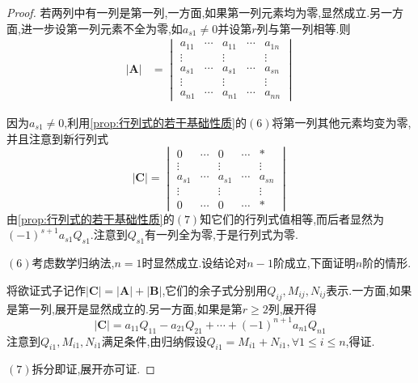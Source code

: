 {\begin{proof}
        若两列中有一列是第一列,一方面,如果第一列元素均为零,显然成立.另一方面,进一步设第一列元素不全为零,如$a_{s1}\neq 0$并设第$r$列与第一列相等.则\begin{align*}
            \left|\bm{A}\right| & =\begin{vmatrix}
                                       a_{11} & \cdots & a_{11} & \cdots & a_{1n} \\
                                       \vdots &        & \vdots &        & \vdots \\
                                       a_{s1} & \cdots & a_{s1} & \cdots & a_{sn} \\
                                       \vdots &        & \vdots &        & \vdots \\
                                       a_{n1} & \cdots & a_{n1} & \cdots & a_{nn}
                                   \end{vmatrix}
        \end{align*}

        因为$a_{s1}\neq 0$,利用\cref{prop:行列式的若干基础性质}的$(6)$将第一列其他元素均变为零,并且注意到新行列式
        \[
            \left|\bm{C}\right|=\begin{vmatrix}
                0      & \cdots & 0      & \cdots & *      \\
                \vdots &        & \vdots &        & \vdots \\
                a_{s1} & \cdots & a_{s1} & \cdots & a_{sn} \\
                \vdots &        & \vdots &        & \vdots \\
                0      & \cdots & 0      & \cdots & *
            \end{vmatrix}
        \]由\cref{prop:行列式的若干基础性质}的$(7)$知它们的行列式值相等,而后者显然为$\displaystyle
            \left(-1\right)^{s+1}a_{s1}Q_{s1}$.注意到$Q_{s1}$有一列全为零,于是行列式为零.

        $(6)$考虑数学归纳法,$n=1$时显然成立.设结论对$n-1$阶成立,下面证明$n$阶的情形.

        将欲证式子记作$\left|\bm{C}\right|=\left|\bm{A}\right|+\left|\bm{B}\right|$,它们的余子式分别用$Q_{ij},M_{ij},N_{ij}$表示.一方面,如果是第一列,展开是显然成立的.另一方面,如果是第$r\geqslant 2$列,展开得\[
            \left|\bm{C}\right|=a_{11}Q_{11}-a_{21}Q_{21}+\cdots+(-1)^{n+1}a_{n1}Q_{n1}
        \]注意到$Q_{i1},M_{i1},N_{i1}$满足条件,由归纳假设$Q_{i1}=M_{i1}+N_{i1},\forall 1\leqslant i\leqslant n$,得证.

        $(7)$拆分即证,展开亦可证.\qedhere
    \end{proof}
}
